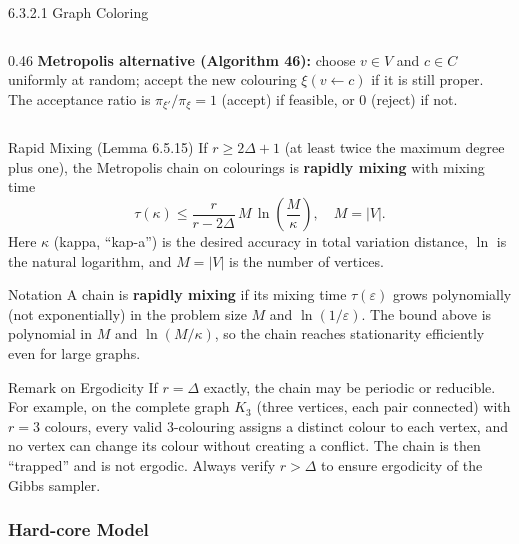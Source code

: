 \documentclass[aspectratio=169,10pt]{beamer}
\begin{document}
\begin{frame}[allowframebreaks]{6.3.2.1 Graph Coloring}
\begin{columns}[T]
\begin{column}{0.46\textwidth}
    \smallskip
    \textbf{Metropolis alternative (Algorithm 46):} choose $v \in V$ and $c \in C$ uniformly at random; accept the new colouring $\xi(v \leftarrow c)$ if it is still proper.
    The acceptance ratio is $\pi_{\xi'}/\pi_\xi = 1$ (accept) if feasible, or $0$ (reject) if not.
  \end{column}
\end{columns}

\framebreak

\begin{block}{Rapid Mixing (Lemma 6.5.15)}
If $r \ge 2\Delta + 1$ (at least twice the maximum degree plus one), the Metropolis chain on colourings is \textbf{rapidly mixing} with mixing time
\[
  \tau(\kappa) \le \frac{r}{r - 2\Delta}\, M\, \ln\!\left(\frac{M}{\kappa}\right), \quad M = |V|.
\]
Here $\kappa$ (kappa, ``kap-a'') is the desired accuracy in total variation distance, $\ln$ is the natural logarithm, and $M = |V|$ is the number of vertices.
\end{block}

\begin{block}{Notation}
A chain is \textbf{rapidly mixing} if its mixing time $\tau(\varepsilon)$ grows polynomially (not exponentially) in the problem size $M$ and $\ln(1/\varepsilon)$.
The bound above is polynomial in $M$ and $\ln(M/\kappa)$, so the chain reaches stationarity efficiently even for large graphs.
\end{block}

\begin{alertblock}{Remark on Ergodicity}
If $r = \Delta$ exactly, the chain may be periodic or reducible.
For example, on the complete graph $K_3$ (three vertices, each pair connected) with $r = 3$ colours, every valid 3-colouring assigns a distinct colour to each vertex, and no vertex can change its colour without creating a conflict.
The chain is then ``trapped'' and is not ergodic.
Always verify $r > \Delta$ to ensure ergodicity of the Gibbs sampler.
\end{alertblock}

\end{frame}

\subsubsection{Hard-core Model}
\end{document}

